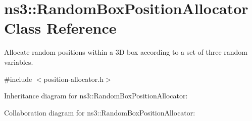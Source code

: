\hypertarget{classns3_1_1RandomBoxPositionAllocator}{}\section{ns3\+:\+:Random\+Box\+Position\+Allocator Class Reference}
\label{classns3_1_1RandomBoxPositionAllocator}


Allocate random positions within a 3D box according to a set of three random variables.  




{\ttfamily \#include $<$position-\/allocator.\+h$>$}



Inheritance diagram for ns3\+:\+:Random\+Box\+Position\+Allocator\+:


Collaboration diagram for ns3\+:\+:Random\+Box\+Position\+Allocator\+:
